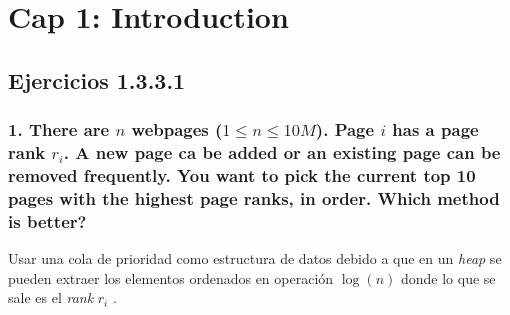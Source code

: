 \documentclass{article}
\begin{document}
\section{Cap 1: Introduction}

\subsection{Ejercicios 1.3.3.1}

\subsubsection{1. There are $n$ webpages ($1 \leq n \leq 10M $). Page $i$ has a page rank $r_{i}$. A new page ca be added or an existing page can be removed frequently. You want to pick the current top 10 pages with the highest page ranks, in order. Which method is better? }

Usar una cola de prioridad como estructura de datos debido a que en un \textit{heap} se pueden extraer los elementos ordenados en operación $\log(n)$ donde lo que se sale es el \textit{rank} $r_{i}$ .
\end{document}
